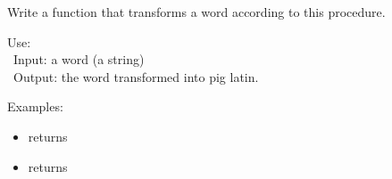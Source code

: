 \documentclass[11pt,class=report,crop=false]{standalone}
\begin{document}
\begin{activite}
\begin{enumerate}
\begin{itemize}
   
 \end{itemize}
 
  Write a function  that transforms a word according to this procedure.
  
  \begin{fonction}
  Use:  \\\
  Input: a word (a string) \\\
  Output: the word transformed into pig latin.
  
  \medskip
    
  Examples: 
  \begin{itemize}
    \item {} returns 
    \item {} returns 
  \end{itemize}    
  \end{fonction} 
  

\end{enumerate} 

\end{activite}


\end{document}
